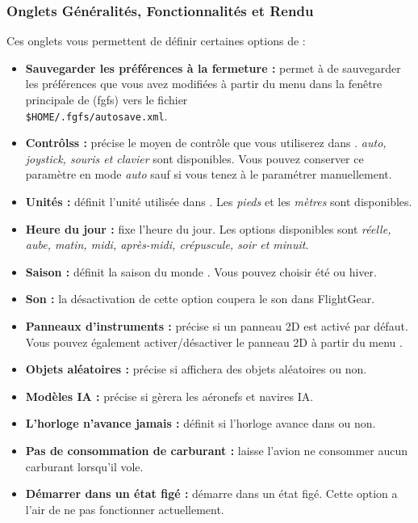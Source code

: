 {{\subsubsection{Onglets G\'{e}n\'{e}ralit\'{e}s, Fonctionnalit\'{e}s et Rendu}
Ces onglets vous permettent de d\'{e}finir certaines options de \FlightGear{} :
\begin{itemize}
\item \textbf{Sauvegarder les pr\'{e}f\'{e}rences \`{a} la fermeture :} permet \`{a} \FlightGear{} de sauvegarder les pr\'{e}f\'{e}rences que vous avez modifi\'{e}es \`{a} partir du menu dans la fen\^{e}tre principale de \FlightGear{} (fgfs) vers le fichier \\ \texttt{\$HOME/.fgfs/autosave.xml}.
\item \textbf{Contr\^{o}lss :} pr\'{e}cise le moyen de contr\^{o}le que vous utiliserez dans \FlightGear{}. \textit{auto, joystick, souris et clavier} sont disponibles. Vous pouvez conserver ce param\`{e}tre en mode \textit{auto} sauf si vous tenez \`{a} le param\'{e}trer manuellement.
\item \textbf{Unit\'{e}s :} d\'{e}finit l'unit\'{e} utilis\'{e}e dans \FlightGear{}. Les \textit{pieds} et les \textit{m\`{e}tres} sont disponibles.
\item \textbf{Heure du jour :} fixe l'heure du jour. Les options disponibles sont \textit{r\'{e}elle, aube, matin, midi, apr\`{e}s-midi, cr\'{e}puscule, soir et minuit}.
\item \textbf{Saison :} d\'{e}finit la saison du monde \FlightGear{}. Vous pouvez choisir \'{e}t\'{e} ou hiver.
\item \textbf{Son :} la d\'{e}sactivation de cette option coupera le son dans FlightGear.
\item \textbf{Panneaux d'instruments :} pr\'{e}cise si un panneau 2D est activ\'{e} par d\'{e}faut. Vous pouvez \'{e}galement activer/d\'{e}sactiver le panneau 2D \`{a} partir du menu \FlightGear{}.
\item \textbf{Objets al\'{e}atoires :} pr\'{e}cise si \FlightGear{} affichera des objets al\'{e}atoires ou non.
\item \textbf{Mod\`{e}les IA :} pr\'{e}cise si \FlightGear{} g\`{e}rera les a\'{e}ronefs et navires IA.
\item \textbf{L'horloge n'avance jamais :} d\'{e}finit si l'horloge avance dans \FlightGear{} ou non.
\item \textbf{Pas de consommation de carburant :} laisse l'avion ne consommer aucun carburant lorsqu'il vole.
\item \textbf{D\'{e}marrer dans un \'{e}tat fig\'{e} :} d\'{e}marre \FlightGear{} dans un \'{e}tat fig\'{e}. Cette option a l'air de ne pas fonctionner actuellement.

\end{itemize}}}
